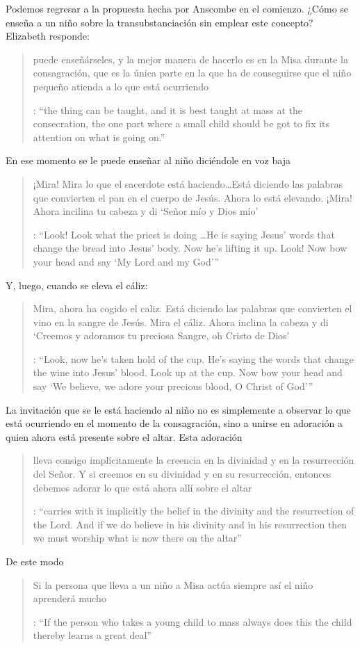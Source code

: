 Podemos regresar a la propuesta hecha por Anscombe en el comienzo. ¿Cómo se enseña a un niño sobre la transubstanciación sin emplear este concepto? Elizabeth responde: \blockquote[{\cite[107]{anscombe1981erp:ot}}: \enquote{the thing can be taught, and it is best taught at mass at the consecration, the one part where a small child should be got to fix its attention on what is going on.}]{puede enseñárseles, y la mejor manera de hacerlo es en la Misa durante la consagración, que es la única parte en la que ha de conseguirse que el niño pequeño atienda a lo que está ocurriendo}. En ese momento se le puede enseñar al niño diciéndole en voz baja \blockquote[{\cite[107]{anscombe1981erp:ot}}: \enquote{Look! Look what the priest is doing \ldots He is saying Jesus' words that change the bread into Jesus' body. Now he's lifting it up. Look! Now bow your head and say `My Lord and my God'}]{¡Mira! Mira lo que el sacerdote está haciendo\ldots  Está diciendo las palabras que convierten el pan en el cuerpo de Jesús. Ahora lo está elevando. ¡Mira! Ahora incilina tu cabeza y di `Señor mío y Dios mío'}. Y, luego, cuando se eleva el cáliz: \blockquote[{\cite[107]{anscombe1981erp:ot}}: \enquote{Look, now he's taken hold of the cup. He's saying the words that change the wine into Jesus' blood. Look up at the cup. Now bow your head and say `We believe, we adore your precious blood, O Christ of God'}]{Mira, ahora ha cogido el caliz. Está diciendo las palabras que convierten el vino en la sangre de Jesús. Mira el cáliz. Ahora inclina la cabeza y di `Creemos y adoramos tu preciosa Sangre, oh Cristo de Dios'}.

La invitación que se le está haciendo al niño no es simplemente a observar lo que está ocurriendo en el momento de la consagración, sino a unirse en adoración a quien ahora está presente sobre el altar. Esta adoración \blockquote[{\cite[107]{anscombe1981erp:ot}}: \enquote{carries with it implicitly the belief in the divinity and the resurrection of the Lord. And if we do believe in his divinity and in his resurrection then we must worship what is now there on the altar}]{lleva consigo implícitamente la creencia en la divinidad y en la resurrección del Señor. Y si creemos en su divinidad y en su resurrección, entonces debemos adorar lo que está ahora allí sobre el altar}. De este modo \blockquote[{\cite[107]{anscombe1981erp:ot}}: \enquote{If the person who takes a young child to mass always does this \textelp{} the child thereby learns a great deal}]{Si la persona que lleva a un niño a Misa actúa siempre así \textelp{} el niño aprenderá mucho}.

